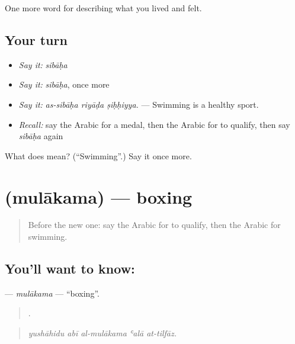 \begin{grammarlens}[title={What you've built}]
One more word for describing what you lived and felt.
\end{grammarlens}

\subsection*{Your turn}
\begin{itemize}
\raggedright
  \item \emph{Say it:} \emph{sibāḥa}
  \item \emph{Say it:} \emph{sibāḥa}, once more
  \item \emph{Say it:} \emph{as-sibāḥa riyāḍa ṣiḥḥiyya.} — Swimming is a healthy sport.
  \item \emph{Recall:} say the Arabic for a medal, then the Arabic for to qualify, then say \emph{sibāḥa} again
\end{itemize}

\begin{tcolorbox}[breakable,colback=teal!4,colframe=teal!35!black,title={Before you move on}]
What does  mean? (\textquotedblleft{}Swimming\textquotedblright{}.) Say it once more.
\end{tcolorbox}
\section[\texorpdfstring{\ar{ملاكمة} (mulākama)}{ملاكمة (mulākama)}]{ (mulākama) — boxing}

\label{lesson:AR-C548-mulakama}



\begin{quote}
Before the new one: say the Arabic for to qualify, then the Arabic for swimming.
\end{quote}

\subsection*{You'll want to know: }
\textbf{} — \emph{mulākama} — \textquotedblleft{}boxing\textquotedblright{}.

\begin{quote}
    .
\end{quote}

\begin{quote}
\emph{yushāhidu abī al-mulākama ʿalā at-tilfāz.}
\end{quote}

